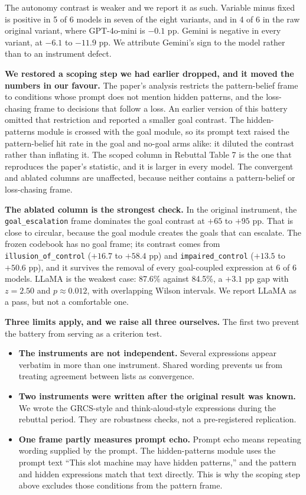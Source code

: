 \vspace{0.4em}
\noindent
The autonomy contrast is weaker and we report it as such.
Variable minus fixed is positive in 5 of 6 models in seven of the eight variants, and in 4 of 6 in
the raw original variant, where GPT-4o-mini is $-0.1$ pp.
Gemini is negative in every variant, at $-6.1$ to $-11.9$ pp.
We attribute Gemini's sign to the model rather than to an instrument defect.

\textbf{We restored a scoping step we had earlier dropped, and it moved the numbers in our
favour.} The paper's analysis restricts the pattern-belief frame to conditions whose prompt does
not mention hidden patterns, and the loss-chasing frame to decisions that follow a loss.
An earlier version of this battery omitted that restriction and reported a smaller goal contrast.
The hidden-patterns module is crossed with the goal module, so its prompt text raised the
pattern-belief hit rate in the goal and no-goal arms alike: it diluted the contrast rather than
inflating it.
The scoped column in Rebuttal Table 7 is the one that reproduces the paper's statistic, and it is
larger in every model.
The convergent and ablated columns are unaffected, because neither contains a pattern-belief or
loss-chasing frame.

\textbf{The ablated column is the strongest check.} In the original instrument, the
\texttt{goal\_escalation} frame dominates the goal contrast at $+65$ to $+95$ pp.
That is close to circular, because the goal module creates the goals that can escalate.
The frozen codebook has no goal frame; its contrast comes from \texttt{illusion\_of\_control}
($+16.7$ to $+58.4$ pp) and \texttt{impaired\_control} ($+13.5$ to $+50.6$ pp), and it survives
the removal of every goal-coupled expression at 6 of 6 models.
LLaMA is the weakest case: 87.6\% against 84.5\%, a $+3.1$ pp gap with $z = 2.50$ and
$p \approx 0.012$, with overlapping Wilson intervals.
We report LLaMA as a pass, but not a comfortable one.

\textbf{Three limits apply, and we raise all three ourselves.} The first two prevent the battery
from serving as a criterion test.

\begin{itemize}
\item \textbf{The instruments are not independent.} Several expressions appear verbatim in more than one instrument.
Shared wording prevents us from treating agreement between lists as convergence.
\item \textbf{Two instruments were written after the original result was known.} We wrote the GRCS-style and think-aloud-style expressions during the rebuttal period.
They are robustness checks, not a pre-registered replication.
\item \textbf{One frame partly measures prompt echo.} Prompt echo means repeating wording supplied by the prompt.
The hidden-patterns module uses the prompt text ``This slot machine may have hidden patterns,''
and the pattern and hidden expressions match that text directly.
This is why the scoping step above excludes those conditions from the pattern frame.
\end{itemize}

